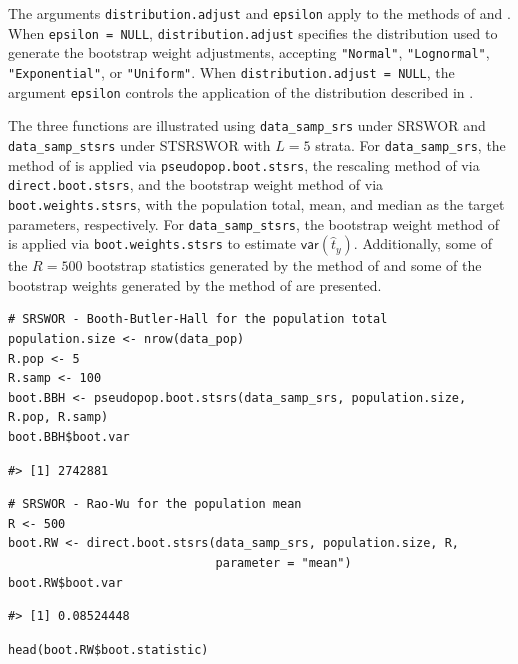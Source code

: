 The arguments \texttt{distribution.adjust} and \texttt{epsilon} apply to the methods of \citet{Bertail:Combris:1997} and \citet{Beaumont:Patak:2012}. When \texttt{epsilon\ =\ NULL}, \texttt{distribution.adjust} specifies the distribution used to generate the bootstrap weight adjustments, accepting \texttt{"Normal"}, \texttt{"Lognormal"}, \texttt{"Exponential"}, or \texttt{"Uniform"}. When \texttt{distribution.adjust\ =\ NULL}, the argument \texttt{epsilon} controls the application of the distribution described in \citet{Beaumont:Patak:2012}.

The three functions are illustrated using \texttt{data\_samp\_srs} under SRSWOR and \texttt{data\_samp\_stsrs} under STSRSWOR with \(L = 5\) strata. For \texttt{data\_samp\_srs}, the method of \citet{Booth:Butler:Hall:1994} is applied via \texttt{pseudopop.boot.stsrs}, the rescaling method of \citet{Rao:Wu:1988} via \texttt{direct.boot.stsrs}, and the bootstrap weight method of \citet{Chipperfield:Preston:2007} via \texttt{boot.weights.stsrs}, with the population total, mean, and median as the target parameters, respectively. For \texttt{data\_samp\_stsrs}, the bootstrap weight method of \citet{Rao:Wu:Yue:1992} is applied via \texttt{boot.weights.stsrs} to estimate \(\mathsf{var}(\hat{t}_y)\). Additionally, some of the \(R = 500\) bootstrap statistics generated by the method of \citet{Rao:Wu:1988} and some of the bootstrap weights generated by the method of \citet{Chipperfield:Preston:2007} are presented.

\begin{verbatim}
# SRSWOR - Booth-Butler-Hall for the population total
population.size <- nrow(data_pop)
R.pop <- 5
R.samp <- 100
boot.BBH <- pseudopop.boot.stsrs(data_samp_srs, population.size, R.pop, R.samp)
boot.BBH$boot.var
\end{verbatim}

\begin{verbatim}
#> [1] 2742881
\end{verbatim}

\begin{verbatim}
# SRSWOR - Rao-Wu for the population mean
R <- 500
boot.RW <- direct.boot.stsrs(data_samp_srs, population.size, R,
                             parameter = "mean")
boot.RW$boot.var
\end{verbatim}

\begin{verbatim}
#> [1] 0.08524448
\end{verbatim}

\begin{verbatim}
head(boot.RW$boot.statistic)
\end{verbatim}

